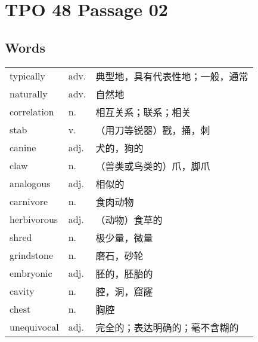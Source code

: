 \section{TPO 48 Passage 02}

\subsection{Words}

\begin{tabular}{lll}
    typically   & adv. & 典型地，具有代表性地；一般，通常 \\
    naturally   & adv. & 自然地              \\
    correlation & n.   & 相互关系；联系；相关       \\
    stab        & v.   & （用刀等锐器）戳，捅，刺     \\
    canine      & adj. & 犬的，狗的            \\
    claw        & n.   & （兽类或鸟类的）爪，脚爪     \\
    analogous   & adj. & 相似的              \\
    carnivore   & n.   & 食肉动物             \\
    herbivorous & adj. & （动物）食草的          \\
    shred       & n.   & 极少量，微量           \\
    grindstone  & n.   & 磨石，砂轮            \\
    embryonic   & adj. & 胚的，胚胎的           \\
    cavity      & n.   & 腔，洞，窟窿           \\
    chest       & n.   & 胸腔               \\
    unequivocal & adj. & 完全的；表达明确的；毫不含糊的  \\
\end{tabular}

